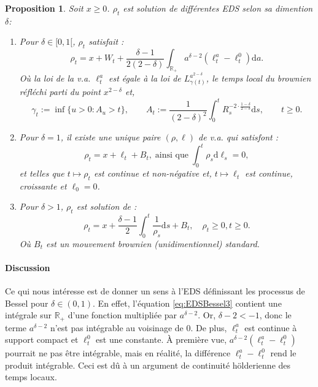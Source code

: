 \documentclass[openany]{book}
\newcommand{\R}{\mathbb{R}}
\newcommand{\1}{\mathbbm{1}}
\renewcommand{\d}{\mathrm{d}}
\theoremstyle{thmfont}
\theoremstyle{deffont}
\theoremstyle{thmfont}
\newtheorem{prop}[prop]{Proposition}
\theoremstyle{deffont}
\begin{document}
\begin{prop}
  \label{prop:EDSBessel}
  Soit $x \geq 0$. $\rho_t$ est solution de différentes EDS selon sa dimention $\delta$:
  \begin{enumerate}
    \item Pour $\delta \in [0,1[$, $\rho_t$ satisfait :
     \begin{equation}
       \rho_t = x + W_t + \dfrac{\delta-1}{2(2-\delta)}\int_{\R_+} a^{\delta -2}(\ell_t^a- \ell_t^0)\d a .
       \label{eq:EDSBessel3}
     \end{equation}
     \noindent Où la loi de la v.a. $\ell_t^a$ est égale à la loi de $L_{\gamma(t)}^{a^{2-\delta}}$, le temps local du brownien réfléchi parti du point $x^{2-\delta}$ et,
     $$\gamma_t := \inf\{u > 0 : A_u > t\}, \qquad
     A_t := \frac{1}{(2 - \delta)^2} \int_0^t R_s^{-2 \cdot \frac{1 - \delta}{2 - \delta}} \d s, \qquad t \geq 0.$$
   \item Pour $\delta =1$, il existe une unique paire $(\rho, \ell)$ de v.a. qui satisfont :
     \begin{equation}
       \rho_t = x + \ell_t + B_t, \;\text{ainsi que}\; \int_0^t \rho_s \d \ell_s = 0,
       \label{eq:EDSBessel2}
     \end{equation}
     \noindent et telles que $t\mapsto \rho_t$ est continue et non-négative et, $t \mapsto \ell_t$ est continue, croissante et $\ell_0 = 0$.\\
   \item Pour $\delta > 1$, $\rho_t$ est solution de :
     \begin{equation}
       \rho_t = x + \dfrac{\delta-1}{2}\int_0^t \dfrac{1}{\rho_s} \d s + B_t, \quad \rho_t \geq 0, t \geq 0.
       \label{eq:EDSBessel1}
     \end{equation}
     \noindent Où $B_t$ est un mouvement brownien (unidimentionnel) standard.
 \end{enumerate}

\end{prop}

\paragraph{Discussion}
Ce qui nous intéresse est de donner un sens à l’EDS définissant les processus de Bessel pour $\delta \in (0,1)$. En effet, l’équation \eqref{eq:EDSBessel3} contient une intégrale sur $\mathbb{R}_+$ d’une fonction multipliée par $a^{\delta-2}$. Or, $\delta-2 < -1$, donc le terme $a^{\delta-2}$ n’est pas intégrable au voisinage de 0. De plus, $\ell_t^a$ est continue à support compact et $\ell_t^0$ est une constante. À première vue, $a^{\delta-2}(\ell_t^a - \ell_t^0)$ pourrait ne pas être intégrable, mais en réalité, la différence $\ell_t^a - \ell_t^0$ rend le produit intégrable. Ceci est dû à un argument de continuité hölderienne des temps locaux.
\end{document}
